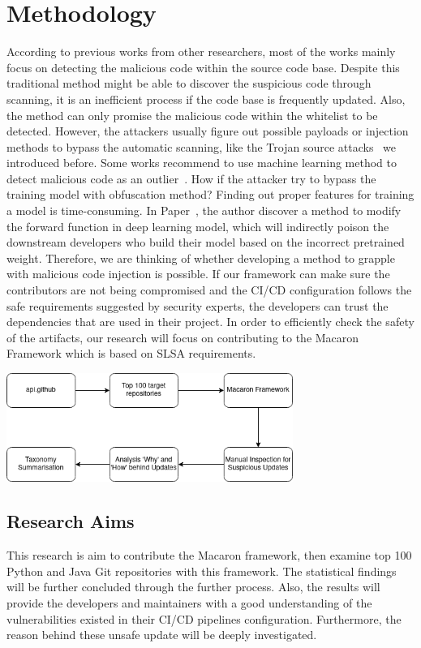 \section{Methodology}
According to previous works from other researchers, most of the works mainly focus on detecting the malicious
code within the source code base. Despite this traditional method might be able to discover the suspicious 
code through scanning, it is an inefficient process if the code base is frequently updated. Also, the method 
can only promise the malicious code within the whitelist to be detected. However, the attackers usually 
figure out possible payloads or injection methods to bypass the automatic scanning, like the Trojan source 
attacks~\cite{boucher2023trojan} we introduced before. 
Some works recommend to use machine learning method to detect malicious code as an outlier~\cite{garrett2019detecting}.
How if the attacker try to bypass the training model with obfuscation method? Finding out proper features for
training a model is time-consuming. In Paper~\cite{zheng2023careful}, 
the author discover a method to modify
the forward function in deep learning model, which will indirectly poison the downstream developers who build 
their model based on the incorrect pretrained weight. 
Therefore, we are thinking of whether developing a method to grapple with malicious code injection is possible.
If our framework can make sure the contributors are not being compromised and the CI/CD configuration follows
the safe requirements suggested by security experts, the developers can trust the dependencies that are
used in their project. 
In order to efficiently check the safety of the artifacts, our research will focus on contributing to the Macaron
Framework which is based on SLSA requirements.

\begin{center}
    \includegraphics[width=0.7\textwidth]{./screenshot/research_flow.png}
\end{center}


\subsection{Research Aims}
This research is aim to contribute the Macaron framework, then examine top 100 Python and Java Git 
repositories with this framework. The statistical findings will be further concluded through the further process.
Also, the results will provide the developers and maintainers with a good understanding 
of the vulnerabilities existed in their CI/CD pipelines configuration. Furthermore, the reason behind
these unsafe update will be deeply investigated.

